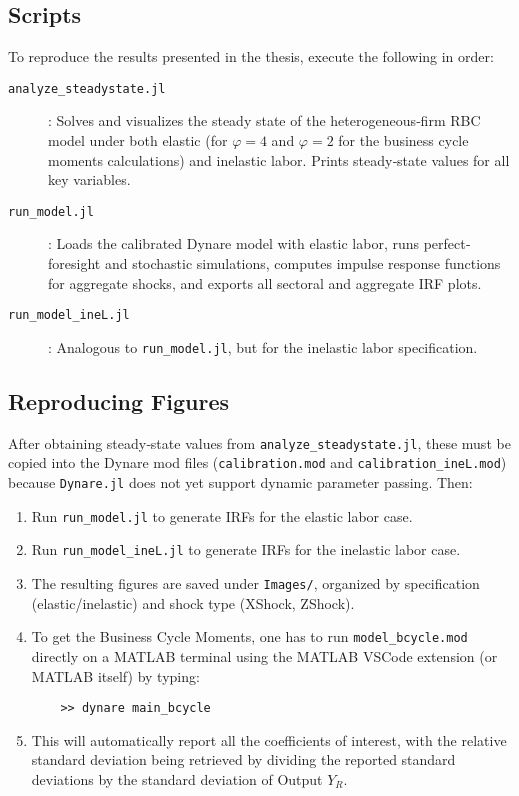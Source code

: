 \documentclass[a4paper,12pt]{article} %
\numberwithin{equation}{section} %
\numberwithin{figure}{section}
\numberwithin{table}{section}
\begin{document}
\begin{refsection}
\begin{appendices}
\subsection{Scripts}

To reproduce the results presented in the thesis, execute the following in order:

\begin{description}
  \item[\texttt{analyze\_steadystate.jl}]: 
    Solves and visualizes the steady state of the heterogeneous‐firm RBC model under both elastic 
    (for $\varphi = 4$ and $\varphi = 2$ for the business cycle moments calculations) and inelastic labor. Prints steady‐state values for all key variables.
  \item[\texttt{run\_model.jl}]: 
    Loads the calibrated Dynare model with elastic labor, runs perfect‐foresight and stochastic simulations, computes impulse response functions for aggregate shocks, and exports all sectoral and aggregate IRF plots.
  \item[\texttt{run\_model\_ineL.jl}]: 
    Analogous to \texttt{run\_model.jl}, but for the inelastic labor specification.
\end{description}

\subsection{Reproducing Figures}

After obtaining steady‐state values from \texttt{analyze\_steadystate.jl}, these must be copied into the Dynare mod files (\texttt{calibration.mod} and \texttt{calibration\_ineL.mod}) because \texttt{Dynare.jl} does not yet support dynamic parameter passing. Then:

\begin{enumerate}
  \item Run \texttt{run\_model.jl} to generate IRFs for the elastic labor case.
  \item Run \texttt{run\_model\_ineL.jl} to generate IRFs for the inelastic labor case.
  \item The resulting figures are saved under \texttt{Images/}, organized by specification 
  (elastic/inelastic) and shock type (XShock, ZShock).
  \item To get the Business Cycle Moments, one has to run \texttt{model\_bcycle.mod} directly on a MATLAB terminal
  using the MATLAB VSCode extension (or MATLAB itself) by typing:
    \begin{verbatim}
    >> dynare main_bcycle
    \end{verbatim}
  \item This will automatically report all the coefficients of interest, with the relative standard deviation being retrieved
  by dividing the reported standard deviations by the standard deviation of Output $Y_R$.
\end{enumerate}



\end{appendices}
\end{refsection}
\end{document}
